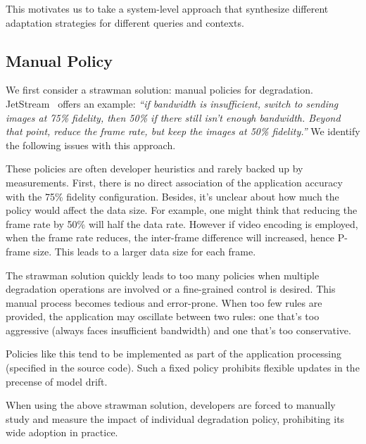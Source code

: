 This motivates us to take a system-level approach that synthesize different
adaptation strategies for different queries and contexts.

\subsection{Manual Policy}
\label{sec:manual-policy}

We first consider a strawman solution: manual policies for
degradation. JetStream~\cite{rabkin2014aggregation} offers an example: \textit{``if
bandwidth is insufficient, switch to sending images at 75\% fidelity, then 50\%
if there still isn't enough bandwidth. Beyond that point, reduce the frame rate,
but keep the images at 50\% fidelity.''} We identify the following issues with
this approach.

 These policies are often developer heuristics and
rarely backed up by measurements. First, there is no direct association of the
application accuracy with the 75\% fidelity configuration. Besides, it's unclear
about how much the policy would affect the data size. For example, one might
think that reducing the frame rate by 50\% will half the data rate. However if
video encoding is employed, when the frame rate reduces, the inter-frame
difference will increased, hence P-frame size. This leads to a larger data size
for each frame.


 The strawman solution quickly leads to too many
policies when multiple degradation operations are involved or a fine-grained
control is desired. This manual process becomes tedious and error-prone. When
too few rules are provided, the application may oscillate between two rules: one
that's too aggressive (always faces insufficient bandwidth) and one that's too
conservative.

 Policies like this tend to be implemented as part of
the application processing (specified in the source code). Such a fixed policy
prohibits flexible updates in the precense of model drift.

 When using the above strawman solution, developers are
forced to manually study and measure the impact of individual degradation
policy, prohibiting its wide adoption in practice.

